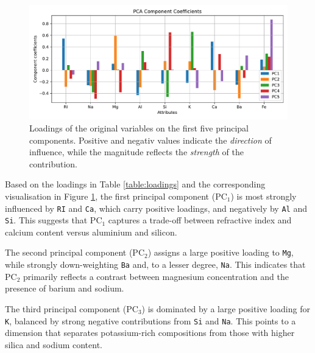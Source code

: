 \documentclass[dtu]{dtuarticle}
\begin{document}
	\begin{figure}
		\centering
		\includegraphics[width=.99\textwidth]{figures/pca_component_coefficients}
		\caption{Loadings of the original variables on the first five principal components. Positive and negativ values indicate the \textit{direction} of influence, while the magnitude reflects the \textit{strength} of the contribution.}
		\label{fig:pc-components}
	\end{figure}

	Based on the loadings in Table \ref{table:loadings} and the corresponding visualisation in Figure \ref{fig:pc-components}, the first principal component ($\text{PC}_1$) is most strongly influenced by \texttt{RI} and \texttt{Ca}, which carry positive loadings, and negatively by \texttt{Al} and \texttt{Si}. This suggests that $\text{PC}_1$ captures a trade-off between refractive index and calcium content versus aluminium and silicon.


	The second principal component ($\text{PC}_2$) assigns a large positive loading to \texttt{Mg}, while strongly down-weighting \texttt{Ba} and, to a lesser degree, \texttt{Na}. This indicates that $\text{PC}_2$ primarily reflects a contrast between magnesium concentration and the presence of barium and sodium.

	The third principal component ($\text{PC}_3$) is dominated by a large positive loading for \texttt{K}, balanced by strong negative contributions from \texttt{Si} and \texttt{Na}. This points to a dimension that separates potassium-rich compositions from those with higher silica and sodium content.
\end{document}
